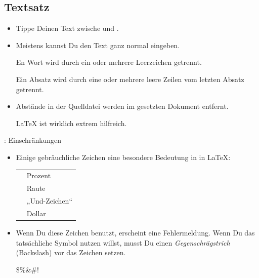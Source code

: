 \documentclass{beamer}
\begin{document}
\subsection{Textsatz}
\begin{frame}[fragile]{\insertsubsection{}}
\small
\begin{itemize}
\item Tippe Deinen Text zwische  und .
\item Meistens kannst Du den Text ganz normal eingeben. 
\begin{exampletwouptiny}
En Wort wird durch ein oder 
mehrere Leerzeichen getrennt.

Ein Absatz wird durch eine oder 
mehrere leere Zeilen 
vom letzten Absatz getrennt.
\end{exampletwouptiny}
\item Abstände in der Quelldatei werden im gesetzten Dokument entfernt.
\begin{exampletwouptiny}
\LaTeX{}   ist           wirklich 
extrem     hilfreich.
\end{exampletwouptiny}
\end{itemize}
\end{frame}

\begin{frame}[fragile]{\insertsubsection{}: Einschränkungen}
\small
\begin{itemize}
\item Einige gebräuchliche Zeichen eine besondere Bedeutung in in \LaTeX:\\[1ex]
\begin{tabular}{cl}
\keystrokebftt{\%} & Prozent           \\
\keystrokebftt{\#} & Raute  \\
\keystrokebftt{\&} & „Und-Zeichen“                 \\
\keystrokebftt{\$} & Dollar              \\
\end{tabular}
\item Wenn Du diese Zeichen benutzt, erscheint eine Fehlermeldung. 
Wenn Du das tatsächliche Symbol nutzen willst, musst Du einen 
\emph{Gegenschrägstrich} (Backslash) vor das Zeichen setzen. 
\begin{exampletwoup}
\$\%\&\#!
\end{exampletwoup}
\end{itemize}
\end{frame}
\end{document}
